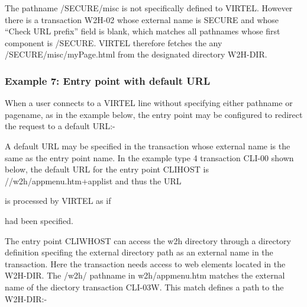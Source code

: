 \documentclass[letterpaper,10pt,english]{sphinxmanual}
\begin{document}
The pathname /SECURE/misc is not specifically defined to VIRTEL. However there is a transaction W2H-02 whose external name is SECURE and whose “Check URL prefix” field is blank, which matches all     pathnames whose first component is /SECURE. VIRTEL therefore fetches the any /SECURE/misc/myPage.html from the designated directory W2H-DIR.


\subsubsection{Example 7: Entry point with default URL}
\label{\detokenize{User_Guide:example-7-entry-point-with-default-url}}
When a user connects to a VIRTEL line without specifying either pathname or pagename, as in the example below, the entry point may be configured to redirect the request to a default URL:-

\begin{sphinxVerbatim}[commandchars=\\\{\}]
\end{sphinxVerbatim}

A default URL may be specified in the transaction whose external name is the same as the entry point name. In the example type 4 transaction CLI-00 shown below, the default URL for the entry point CLIHOST is //w2h/appmenu.htm+applist and thus the URL

\begin{sphinxVerbatim}[commandchars=\\\{\}]
\end{sphinxVerbatim}

is processed by VIRTEL as if

\begin{sphinxVerbatim}[commandchars=\\\{\}]
\end{sphinxVerbatim}

had been specified.

 

The entry point CLIWHOST can access the w2h directory through a directory definition specifing the external directory path as an external name in the transaction. Here the transaction needs access to web elements located in the W2H-DIR. The /w2h/ pathname in w2h/appmenu.htm matches the external name of the diectory transaction CLI-03W. This match defines a path to the W2H-DIR:-
\end{document}
